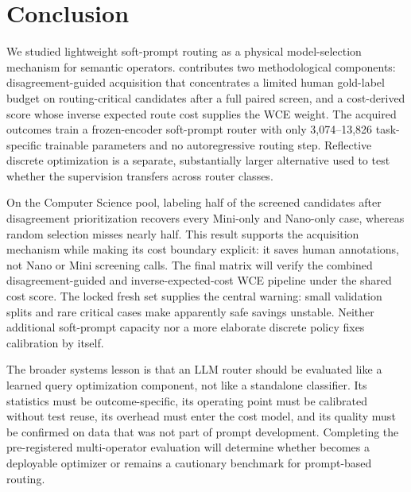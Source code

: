 \section{Conclusion}

We studied lightweight soft-prompt routing as a physical model-selection
mechanism for semantic operators. \system contributes two methodological
components: disagreement-guided acquisition that concentrates a limited human
gold-label budget on routing-critical candidates after a full paired screen,
and a cost-derived score whose inverse expected route cost supplies the WCE
weight. The acquired outcomes train a frozen-encoder soft-prompt router with
only 3,074--13,826 task-specific trainable parameters and no autoregressive
routing step. Reflective discrete optimization is a separate, substantially
larger alternative used to test whether the supervision transfers across
router classes.

On the Computer Science pool, labeling half of the screened candidates after
disagreement prioritization recovers every Mini-only and Nano-only case, whereas
random selection misses nearly half. This result supports the acquisition
mechanism while making its cost boundary explicit: it saves human annotations,
not Nano or Mini screening calls. The final matrix will verify the combined
disagreement-guided and inverse-expected-cost WCE pipeline under the shared cost
score.
The locked fresh set supplies the central warning: small validation splits and
rare critical cases make apparently safe savings unstable. Neither additional
soft-prompt capacity nor a more elaborate discrete policy fixes calibration by
itself.

The broader systems lesson is that an LLM router should be evaluated like a
learned query optimization component, not like a standalone classifier. Its
statistics must be outcome-specific, its operating point must be calibrated
without test reuse, its overhead must enter the cost model, and its quality must
be confirmed on data that was not part of prompt development. Completing the
pre-registered multi-operator evaluation will determine whether \system becomes
a deployable optimizer or remains a cautionary benchmark for prompt-based
routing.

